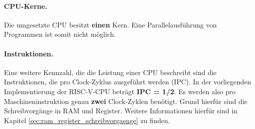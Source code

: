 \paragraph{CPU-Kerne.} Die umgesetzte CPU besitzt \textbf{einen} Kern.
Eine Parallelausführung von Programmen ist somit nicht möglich.

\paragraph{Instruktionen.} Eine weitere Kennzahl, die die Leistung einer
CPU beschreibt sind die Instruktionen, die pro Clock-Zyklus ausgeführt
werden (IPC). 
In der vorliegenden Implementierung der RISC-V-CPU beträgt \textbf{IPC =
1/2}. Es werden also pro Maschineninstruktion genau \textbf{zwei}
Clock-Zyklen benötigt. Grund hierfür sind die Schreibvorgänge in RAM und
Register. Weitere Informationen hierfür sind in Kapitel
\ref{sec:ram_register_schreibvorgaenge} zu finden.










